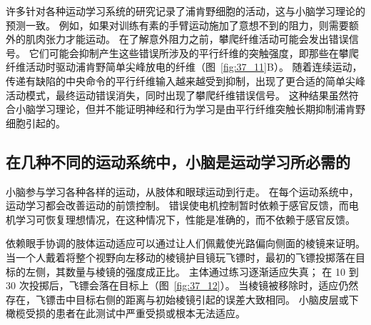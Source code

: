 许多针对各种运动学习系统的研究记录了浦肯野细胞的活动，这与小脑学习理论的预测一致。
例如，如果对训练有素的手臂运动施加了意想不到的阻力，则需要额外的肌肉张力才能运动。
在了解意外阻力之前，攀爬纤维活动可能会发出错误信号。
它们可能会抑制产生这些错误所涉及的平行纤维的突触强度，即那些在攀爬纤维活动时驱动浦肯野简单尖峰放电的纤维（图~\ref{fig:37_11}B）。
随着连续运动，传递有缺陷的中央命令的平行纤维输入越来越受到抑制，出现了更合适的简单尖峰活动模式，最终运动错误消失，同时出现了攀爬纤维错误信号。
这种结果虽然符合小脑学习理论，但并不能证明神经和行为学习是由平行纤维突触长期抑制浦肯野细胞引起的。



\subsection{在几种不同的运动系统中，小脑是运动学习所必需的}

小脑参与学习各种各样的运动，从肢体和眼球运动到行走。
在每个运动系统中，运动学习都会改善运动的前馈控制。
错误使电机控制暂时依赖于感官反馈，而电机学习可恢复理想情况，在这种情况下，性能是准确的，而不依赖于感官反馈。


依赖眼手协调的肢体运动适应可以通过让人们佩戴使光路偏向侧面的棱镜来证明。
当一个人戴着将整个视野向左移动的棱镜护目镜玩飞镖时，最初的飞镖投掷落在目标的左侧，其数量与棱镜的强度成正比。
主体通过练习逐渐适应失真；
在 10 到 30 次投掷后，飞镖会落在目标上（图~\ref{fig:37_12}）。
当棱镜被移除时，适应仍然存在，飞镖击中目标右侧的距离与初始棱镜引起的误差大致相同。
小脑皮层或下橄榄受损的患者在此测试中严重受损或根本无法适应。



